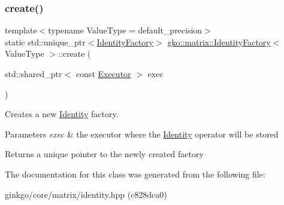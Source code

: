 \subsubsection{\texorpdfstring{create()}{create()}}
{\footnotesize\ttfamily template$<$typename Value\+Type  = default\+\_\+precision$>$ \\
static std\+::unique\+\_\+ptr$<$\hyperlink{classgko_1_1matrix_1_1IdentityFactory}{Identity\+Factory}$>$ \hyperlink{classgko_1_1matrix_1_1IdentityFactory}{gko\+::matrix\+::\+Identity\+Factory}$<$ Value\+Type $>$\+::create (\begin{DoxyParamCaption}\item[{std\+::shared\+\_\+ptr$<$ const \hyperlink{classgko_1_1Executor}{Executor} $>$}]{exec }\end{DoxyParamCaption})\hspace{0.3cm}{\ttfamily [static]}}



Creates a new \hyperlink{classgko_1_1matrix_1_1Identity}{Identity} factory. 


\begin{DoxyParams}{Parameters}
{\em exec} & the executor where the \hyperlink{classgko_1_1matrix_1_1Identity}{Identity} operator will be stored\\
\hline
\end{DoxyParams}
\begin{DoxyReturn}{Returns}
a unique pointer to the newly created factory 
\end{DoxyReturn}


The documentation for this class was generated from the following file\+:\begin{DoxyCompactItemize}
\item 
ginkgo/core/matrix/identity.\+hpp (c828dca0)\end{DoxyCompactItemize}
